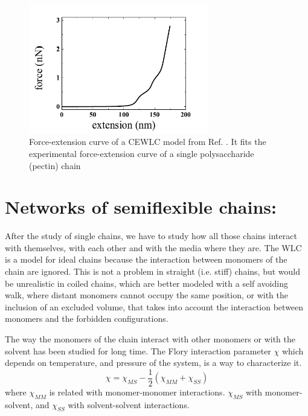 \begin{figure}[ht]
\begin{center}
\includegraphics[width=0.7\textwidth,height=0.5\textwidth]{Figures/chapter-intro/forceextension_CEWLC.png}%

\caption[Force extension curve: CEWLC]{Force-extension curve of a CEWLC model
from Ref. \citep{schuster_hierarchical_2011}. It fits the experimental
force-extension curve of a single polysaccharide (pectin) chain \citep{haverkamp_model_2007} }
\label{fig:force_extension_CEWLC}
\end{center}
\end{figure}

\section{Networks of semiflexible chains:}
After the study of single chains, we have to study how all those chains interact
with themselves, with each other and with the media where they are.
The WLC is a model for ideal chains because the interaction between
monomers of the chain are ignored. This is not a problem in straight
(i.e. stiff) chains, but would be unrealistic in coiled chains, which are better
modeled with a self avoiding walk, where distant monomers cannot occupy the
same position, or with the inclusion of an excluded volume, that takes into
account the interaction between monomers and the forbidden configurations.

The way the monomers of the chain interact with other monomers or with the
solvent has been studied for long time. The Flory interaction parameter $\chi$
which depends on temperature, and pressure of the system, is a way to
characterize it.
\begin{equation}\label{FloryInteraction}
\chi=\chi_{MS} - \frac{1}{2}(\chi_{MM} + \chi_{SS})
\end{equation}
where  $\chi_{MM}$ is related with monomer-monomer interactions. $\chi_{MS}$
with monomer-solvent, and $\chi_{SS}$ with solvent-solvent
interactions.

